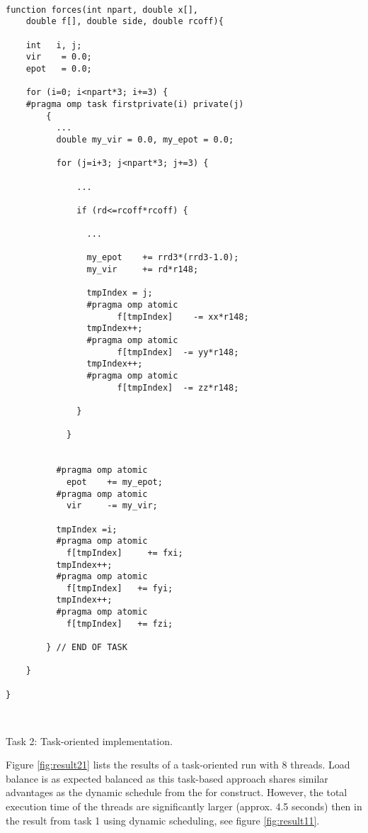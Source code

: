 \documentclass[journal]{IEEEtran}
\begin{document}
\begin{code}[here]
	\begin{lstlisting}[style=c++]
    	
function forces(int npart, double x[], 
	double f[], double side, double rcoff){

    int   i, j;
    vir    = 0.0;
    epot   = 0.0;

    for (i=0; i<npart*3; i+=3) {
    #pragma omp task firstprivate(i) private(j) 
      	{
          ...
          double my_vir = 0.0, my_epot = 0.0;
       
          for (j=i+3; j<npart*3; j+=3) {
      
              ...	
      
              if (rd<=rcoff*rcoff) {
      
                ...
      
                my_epot    += rrd3*(rrd3-1.0);
                my_vir     += rd*r148;
      
                tmpIndex = j;
                #pragma omp atomic
                      f[tmpIndex]    -= xx*r148;
                tmpIndex++;
                #pragma omp atomic
                      f[tmpIndex]  -= yy*r148;
                tmpIndex++;
                #pragma omp atomic
                      f[tmpIndex]  -= zz*r148;
      
              }
      
			}
      
          
          #pragma omp atomic
          	epot    += my_epot;
          #pragma omp atomic
          	vir     -= my_vir;	
      
          tmpIndex =i;
          #pragma omp atomic
          	f[tmpIndex]     += fxi;
          tmpIndex++;
          #pragma omp atomic
          	f[tmpIndex]   += fyi;
          tmpIndex++;
          #pragma omp atomic
          	f[tmpIndex]   += fzi;

		} // END OF TASK

	}

}

    
    \end{lstlisting}
    \caption{Task 2: Task-oriented implementation.}
    \label{code:impl21}
\end{code}


Figure \ref{fig:result21} lists the results of a task-oriented run with 8 threads. Load balance is as expected balanced as this task-based approach shares similar advantages as the dynamic schedule from the for construct. However, the total execution time of the threads are significantly larger (approx. 4.5 seconds) then in the result from task 1 using dynamic scheduling, see figure \ref{fig:result11}.
\end{document}
